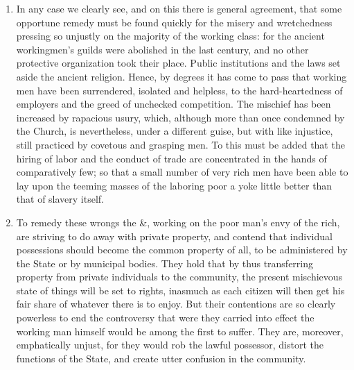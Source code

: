 \documentclass{book}
\begin{document}
\begin{enumerate}
	\item In any case we clearly see, and on this there is general agreement, that some opportune remedy must be found quickly for the misery and wretchedness pressing so unjustly on the majority of the working class: for the ancient workingmen’s guilds were abolished in the last century, and no other protective organization took their place. Public institutions and the laws set aside the ancient religion. Hence, by degrees it has come to pass that working men have been surrendered, isolated and helpless, to the hard-heartedness of employers and the greed of unchecked competition. The mischief has been increased by rapacious usury, which, although more than once condemned by the Church, is nevertheless, under a different guise, but with like injustice, still practiced by covetous and grasping men. To this must be added that the hiring of labor and the conduct of trade are concentrated in the hands of comparatively few; so that a small number of very rich men have been able to lay upon the teeming masses of the laboring poor a yoke little better than that of slavery itself.


	\item To remedy these wrongs the \&, working on the poor man’s envy of the rich, are striving to do away with private property, and contend that individual possessions should become the common property of all, to be administered by the State or by municipal bodies. They hold that by thus transferring property from private individuals to the community, the present mischievous state of things will be set to rights, inasmuch as each citizen will then get his fair share of whatever there is to enjoy. But their contentions are so clearly powerless to end the controversy that were they carried into effect the working man himself would be among the first to suffer. They are, moreover, emphatically unjust, for they would rob the lawful possessor, distort the functions of the State, and create utter confusion in the community.



\end{enumerate}
\end{document}
